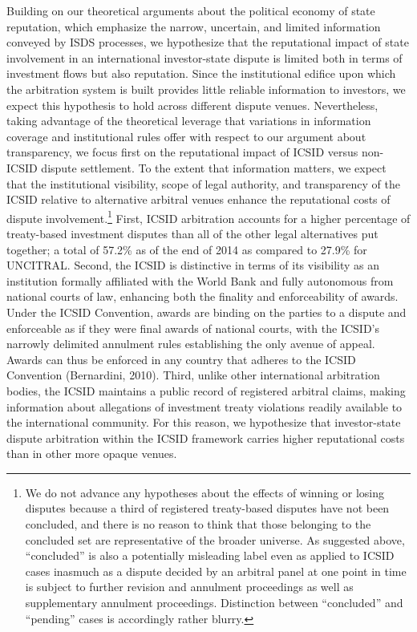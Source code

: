 \documentclass[12pt,onesided]{amsart}
\begin{document}
Building on our theoretical arguments about the political economy of state reputation, which emphasize the narrow, uncertain, and limited information conveyed by ISDS processes, we hypothesize that the reputational impact of state involvement in an international investor-state dispute is limited both in terms of investment flows but also reputation. Since the institutional edifice upon which the arbitration system is built provides little reliable information to investors, we expect this hypothesis to hold across different dispute venues. Nevertheless, taking advantage of the theoretical leverage that variations in information coverage and institutional rules offer with respect to our argument about transparency, we focus first on the reputational impact of ICSID versus non-ICSID dispute settlement. To the extent that information matters, we expect that the institutional visibility, scope of legal authority, and transparency of the ICSID relative to alternative arbitral venues enhance the reputational costs of dispute involvement.\footnote{We do not advance any hypotheses about the effects of winning or losing disputes because a third of registered treaty-based disputes have not been concluded, and there is no reason to think that those belonging to the concluded set are representative of the broader universe. As suggested above, ``concluded'' is also a potentially misleading label even as applied to ICSID cases inasmuch as a dispute decided by an arbitral panel at one point in time is subject to further revision and annulment proceedings as well as supplementary annulment proceedings. Distinction between ``concluded'' and ``pending'' cases is accordingly rather blurry.} First, ICSID arbitration accounts for a higher percentage of treaty-based investment disputes than all of the other legal alternatives put together; a total of 57.2\% as of the end of 2014 as compared to 27.9\% for UNCITRAL. Second, the ICSID is distinctive in terms of its visibility as an institution formally affiliated with the World Bank and fully autonomous from national courts of law, enhancing both the finality and enforceability of awards. Under the ICSID Convention, awards are binding on the parties to a dispute and enforceable as if they were final awards of national courts, with the ICSID's narrowly delimited annulment rules establishing the only avenue of appeal. Awards can thus be enforced in any country that adheres to the ICSID Convention (Bernardini, 2010). Third, unlike other international  arbitration bodies, the ICSID maintains a public record of registered arbitral claims, making information about allegations of investment treaty violations readily available to the international community. For this reason, we hypothesize that investor-state dispute arbitration within the ICSID framework carries higher reputational costs than in other more opaque venues. 
\end{document}
